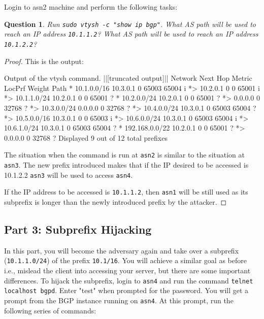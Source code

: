 \documentclass[a4paper,11pt,hidelinks]{article}
\newtheorem{theorem}{Question}[subsection]
\begin{document}
Login to asn2 machine and perform the following tasks:

\begin{theorem}
    Run \verb=sudo vtysh -c "show ip bgp"=. What AS path will be used to reach an IP address \verb=10.1.1.2=? What AS path will be used to reach an IP address \verb=10.1.2.2=?
\end{theorem}

\begin{proof}
    This is the output:

\begin{code}{Output of the vtysh command.}
||[truncated output]||
Network          Next Hop            Metric LocPrf Weight Path
*  10.1.0.0/16      10.3.0.1                               0 65003 65004 i
*>                  10.2.0.1                 0             0 65001 i
*> 10.1.1.0/24      10.2.0.1                 0             0 65001 ?
*  10.2.0.0/24      10.2.0.1                 0             0 65001 ?
*>                  0.0.0.0                  0         32768 ?
*> 10.3.0.0/24      0.0.0.0                  0         32768 ?
*> 10.4.0.0/24      10.3.0.1                               0 65003 65004 ?
*> 10.5.0.0/16      10.3.0.1                 0             0 65003 i
*> 10.6.0.0/24      10.3.0.1                               0 65003 65004 i
*> 10.6.1.0/24      10.3.0.1                               0 65003 65004 ?
*  192.168.0.0/22   10.2.0.1                 0             0 65001 ?
*>                  0.0.0.0                  0         32768 ?
Displayed  9 out of 12 total prefixes
\end{code}

    The situation when the command is run at \verb=asn2= is similar to the situation at \verb=asn3=. The new prefix introduced makes that if the IP desired to be accessed is 10.1.2.2 \verb=asn3= will be used to access \verb=asn4=. 
    
    If the IP address to be accessed is \verb=10.1.1.2=, then \verb=asn1= will be still used as its subprefix is longer than the newly introduced prefix by the attacker.
\end{proof}

\clearpage
\newpage
\subsection{Part 3: Subprefix Hijacking}

In this part, you will become the adversary again and take over a subprefix (\verb=10.1.1.0/24=) of the prefix \verb=10.1/16=. You will achieve a similar goal as before i.e., mislead the client into accessing your server, but there are some important differences. To hijack the subprefix, login to \verb=asn4= and run the command \verb=telnet localhost bgpd=. Enter "test" when prompted for the password. You will get a prompt from the BGP instance running on \verb=asn4=. At this prompt, run the following series of commands:
\end{document}
